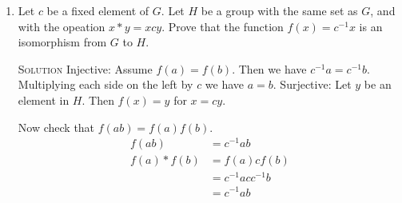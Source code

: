 \documentclass[twoside]{amsart}
\newcommand{\solution}{\textsc{Solution}\xspace}
\newcommand{\iso}{\cong}
\newcommand{\blank}{\vspace{5pt}}
\begin{document}
\begin{enumerate}[A.]
\begin{enumerate}[1]
      \blank \noindent \solution Let $f$ be $f(x) = x^{-1}$. This function
      is bijective. 
      \begin{align*}
         f(a \circ b) &= (a \circ b)^{-1} \\
                      &= b^{-1} \circ a^{-1} \\
         f(a)*f(b) &= f(b) \circ f(a) \\
                   &= b^{-1} \circ a^{-1}
      \end{align*}

      I've shown that $f$ is an isomorphism from $G$ to $H$ and therefore
      $G \iso H$.

      \blank
      \item Let $c$ be a fixed element of $G$. Let $H$ be a group with
      the same set as $G$, and with the opeation $x * y = xcy$. Prove
      that the function $f(x) = c^{-1}x$ is an isomorphism from $G$ to $H$.

      \blank \noindent \solution Injective: Assume $f(a)=f(b)$. Then
      we have $c^{-1}a = c^{-1}b$. Multiplying each side on the left by $c$
      we have $a=b$. Surjective: Let $y$ be an element in $H$. Then
      $f(x) = y$ for $x = cy$.

      Now check that $f(ab)=f(a)f(b)$.
      \begin{align*}
         f(ab) &= c^{-1}ab \\
         f(a)*f(b) &= f(a)cf(b) \\
                   &= c^{-1}acc^{-1}b \\
                   &= c^{-1}ab
      \end{align*}



   \end{enumerate}

\end{enumerate}
\end{document}
